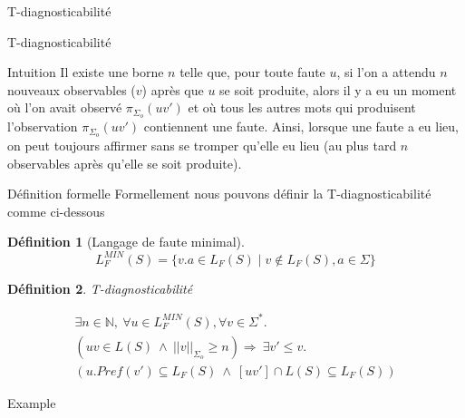 \documentclass[11pt]{beamer}
\newtheorem{mydef}{D\'efinition}
\begin{document}
\begin{section}{T-diagnosticabilit\'e}

  \begin{frame}{T-diagnosticabilit\'e}
    \begin{block}{Intuition}
      Il existe une borne $n$ telle que, pour toute faute $u$, si l'on a attendu $n$ nouveaux observables ($v$) après que $u$ se soit produite, alors il y a eu un moment où l'on avait observé $\pi_{\Sigma_o}(uv')$ et où tous les autres mots qui produisent l'observation $\pi_{\Sigma_o}(uv')$ contiennent une faute. Ainsi, lorsque une faute a eu lieu, on peut toujours affirmer sans se tromper qu'elle eu lieu (au plus tard $n$ observables après qu'elle se soit produite).
    \end{block}
  \end{frame}

  \begin{frame}{D\'efinition formelle}
    Formellement nous pouvons d\'efinir la T-diagnosticabilit\'e comme ci-dessous

    \begin{mydef}[Langage de faute minimal]

      $$L_{F}^{MIN}(S) =  \{v.a \in L_F(S) \mid v\not \in L_F(S), a\in \Sigma \} $$
    \end{mydef}
    
    \begin{mydef}{T-diagnosticabilité}
      
      $$
      \begin{array}{l}
        \exists n \in \mathbb{N}, \ \forall u \in L^{MIN}_F(S), \forall v \in \Sigma^*.\\
        (uv \in L(S) \ \wedge \  ||v||_{\Sigma_o}\geq n) \Rightarrow \ \exists v' \leq v. \\
(u.Pref(v') \subseteq L_F(S) \ \wedge \  [uv'] \cap L(S) \subseteq L_F(S))
      \end{array}
      $$

    \end{mydef}
    
  \end{frame}

  \begin{frame}{Example}
    

\end{frame}
\end{section}
\end{document}
